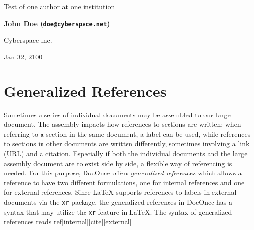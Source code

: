 \documentclass[%
oneside,                 %
final,                   %
chapterprefix=true,      %
open=right,              %
10pt]{book}
\begin{document}
\newcommand{\exercisesection}[1]{\subsection*{#1}}


\thispagestyle{empty}
\begin{center}
{\LARGE\bf
\begin{spacing}{1.25}
Test of one author at one institution
\end{spacing}
}
\end{center}
\begin{center}
{\bf John Doe (\texttt{doe@cyberspace.net})}
\end{center}
    \begin{center}
\centerline{{\small Cyberspace Inc.}}
\end{center}
    
\begin{center}
Jan 32, 2100
\end{center}
\vspace{1cm}
\chapter{Generalized References}
\label{genrefs}
Sometimes a series of individual documents may be assembled to one
large document. The assembly impacts how references to sections
are written: when referring to a section in the same document, a label
can be used, while references to sections in other documents are
written differently, sometimes involving a link (URL) and a citation.
Especially if both the individual documents and the large assembly document
are to exist side by side, a flexible way of referencing is needed.
For this purpose, DocOnce offers \emph{generalized references} which allows
a reference to have two different formulations, one for internal
references and one for external references. Since {\LaTeX} supports
references to labels in external documents via the \texttt{xr} package,
the generalized references in DocOnce has a syntax that may utilize
the \texttt{xr} feature in {\LaTeX}.
The syntax of generalized references reads
\bccq
ref[internal][cite][external]
\end{document}
